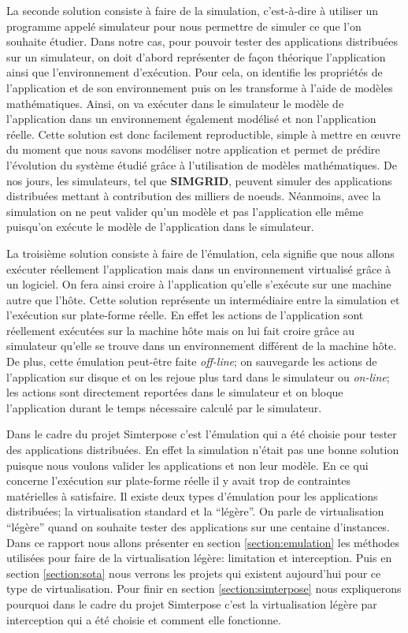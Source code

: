 {\color{red}La seconde solution consiste à faire de la simulation, c'est-à-dire à utiliser un programme appelé simulateur pour nous permettre de simuler ce que l'on souhaite étudier.} Dans notre cas, pour pouvoir tester des applications distribuées sur un simulateur, on doit d'abord représenter de façon théorique l'application ainsi que l'environnement d'exécution. Pour cela, on identifie les propriétés de l'application et de son environnement puis on les transforme à l'aide de modèles mathématiques. Ainsi, on va exécuter dans le simulateur le modèle de l'application dans un environnement également modélisé et non l'application réelle. Cette solution est donc facilement reproductible, simple à mettre en \oe uvre du moment que nous savons modéliser notre application et permet de prédire l'évolution du système étudié grâce à l'utilisation de modèles mathématiques. De nos jours, les simulateurs, tel que  \textbf{SIMGRID}\cite{SIMULATION:CASANOVA, SIMULATION:MARTIN}, peuvent simuler des applications distribuées mettant à contribution des milliers de noeuds. Néanmoins, avec la simulation on ne peut valider qu'un modèle et pas l'application elle même puisqu'on exécute le modèle de l'application dans le simulateur. 

La troisième solution consiste à faire de l'émulation, cela signifie que nous allons exécuter réellement l'application mais dans un environnement virtualisé grâce à un logiciel. On fera ainsi croire à l'application qu'elle s'exécute sur une machine autre que l'hôte. Cette solution représente un intermédiaire entre la simulation et l'exécution sur plate-forme réelle. En effet les actions de l'application sont réellement exécutées sur la machine hôte mais on lui fait croire grâce au simulateur qu'elle se trouve dans un environnement différent de la machine hôte. De plus, cette émulation peut-être faite \textit{off-line}; on sauvegarde les actions de l'application sur disque et on les rejoue plus tard dans le simulateur ou \textit{on-line}; les actions sont directement reportées dans le simulateur et on bloque l'application durant le temps nécessaire calculé par le simulateur.

Dans le cadre du projet Simterpose c'est l'émulation qui a été choisie pour tester des applications distribuées. En effet la simulation n'était pas une bonne solution puisque nous voulons valider les applications et non leur modèle. En ce qui concerne l'exécution sur plate-forme réelle il y avait trop de contraintes matérielles à satisfaire. Il existe deux types d'émulation pour les applications distribuées; la virtualisation standard et la ``légère''. On parle de virtualisation ``légère'' quand on souhaite tester des applications sur une centaine d'instances. Dans ce rapport nous allons présenter en section \ref{section:emulation} les méthodes utilisées pour faire de la virtualisation légère: limitation et interception. Puis en section \ref{section:sota} nous verrons les projets qui existent aujourd'hui pour ce type de virtualisation. Pour finir en section \ref{section:simterpose} nous expliquerons pourquoi dans le cadre du projet Simterpose c'est la virtualisation légère par interception qui a été choisie et comment elle fonctionne.


